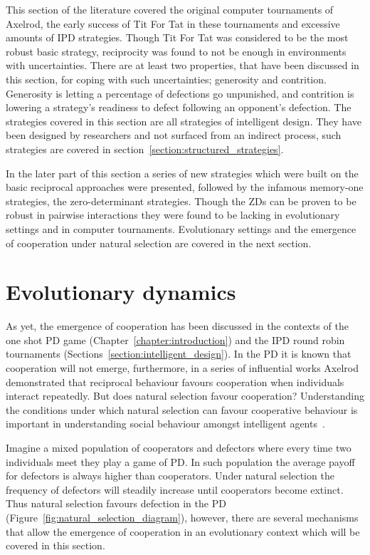 This section of the literature covered the original computer tournaments of
Axelrod, the early success of Tit For Tat in these tournaments and excessive
amounts of IPD strategies. Though Tit For Tat was
considered to be the most robust basic strategy, reciprocity was found to not
be enough in environments with uncertainties. There are at least two properties,
that have been discussed in this section, for coping with such uncertainties;
generosity and contrition. Generosity is letting a percentage of defections go
unpunished, and contrition is lowering a strategy's readiness to defect
following an opponent's defection. The strategies covered in this section are all
strategies of intelligent design. They have been designed by researchers and
not surfaced from an indirect process, such strategies are covered in
section~\ref{section:structured_strategies}.

In the later part of this section a series of new strategies which were built on
the basic reciprocal approaches were presented, followed by the infamous memory-one
strategies, the zero-determinant strategies. Though the ZDs can be proven to be robust
in pairwise interactions they were found to be lacking in evolutionary settings
and in computer tournaments. Evolutionary settings and the emergence
of cooperation under natural selection are covered in the next section.

\section{Evolutionary dynamics}\label{section:evolutionary_dynamics}

As yet, the emergence of cooperation has been discussed in the contexts of the
one shot PD game (Chapter~\ref{chapter:introduction}) and the IPD round robin
tournaments (Sections~\ref{section:intelligent_design}). In the PD it is
known that cooperation will not emerge, furthermore, in a series of influential works
Axelrod demonstrated that reciprocal behaviour favours cooperation when
individuals interact repeatedly. But does natural selection favour cooperation?
Understanding the conditions under which natural selection can favour
cooperative behaviour is important in understanding social behaviour amongst
intelligent agents~\cite{Boyd1987}.

Imagine a mixed population of cooperators and defectors where every
time two individuals meet they play a game of PD. In such population the average
payoff for defectors is always higher than cooperators. Under natural selection
the frequency of defectors will steadily increase until cooperators become
extinct. Thus natural selection favours defection in the PD
(Figure~\ref{fig:natural_selection_diagram}), however, there are several mechanisms
that allow the emergence of cooperation in an evolutionary context which will be
covered in this section.

